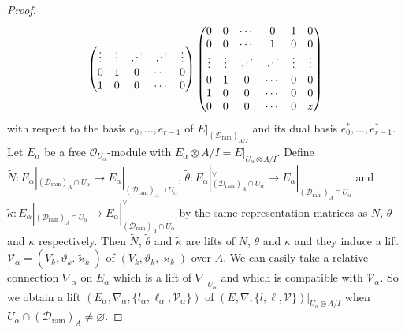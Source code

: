 \documentclass[pdftex]{sigma}
\numberwithin{equation}{section}
\begin{document}
\begin{proof}
\[\begin{pmatrix}
 \vdots & \vdots & \iddots & \iddots & \vdots \\
 0 & 1 & 0 & \cdots & 0 \\
 1 & 0 & 0 & \cdots & 0
 \end{pmatrix}
 \begin{pmatrix}
 0 & 0 & \cdots & 0 & 1 & 0 \\
 0 & 0 & \cdots & 1 & 0 & 0 \\
 \vdots \vspace{2pt}& \vdots & \iddots & \iddots & \vdots & \vdots \\
 0 & 1 & 0 & \cdots & 0 & 0 \\
 1 & 0 & 0 & \cdots & 0 & 0 \\
 0 & 0 & 0 & \cdots & 0 & z
 \end{pmatrix}
\]
with respect to the basis
$e_0,\dots,e_{r-1}$ of $E|_{({\mathcal D}_{\mathrm{ram}})_{A/I}}$
and its dual basis
$e_0^*,\dots,e_{r-1}^*$.
Let $E_{\alpha}$ be a free ${\mathcal O}_{U_{\alpha}}$-module with
$E_{\alpha}\otimes A/I=E|_{U_{\alpha}\otimes A/I}$.
Define
$\tilde{N}\colon E_{\alpha}|_{({\mathcal D}_{\mathrm{ram}})_A\cap U_{\alpha}}
\longrightarrow E_{\alpha}|_{({\mathcal D}_{\mathrm{ram}})_A\cap U_{\alpha}}$,
$\tilde{\theta}\colon E_{\alpha}|_{({\mathcal D}_{\mathrm{ram}})_A\cap U_{\alpha}}^{\vee}
\longrightarrow E_{\alpha}|_{({\mathcal D}_{\mathrm{ram}})_A\cap U_{\alpha}}$
and
$\tilde{\kappa}\colon E_{\alpha}|_{({\mathcal D}_{\mathrm{ram}})_A\cap U_{\alpha}}
\longrightarrow E_{\alpha}|_{({\mathcal D}_{\mathrm{ram}})_A\cap U_{\alpha}}^{\vee}$
by the same representation matrices as $N$, $\theta$ and $\kappa$ respectively.
Then $\tilde{N}$, $\tilde{\theta}$ and $\tilde{\kappa}$ are lifts of $N$, $\theta$ and $\kappa$
and they induce a lift
${\mathcal V}_{\alpha}=(\tilde{V}_k,\tilde{\vartheta}_k.\tilde{\varkappa}_k)$
of $(V_k,\vartheta_k,\varkappa_k)$ over $A$.
We can easily take a relative connection
$\nabla_{\alpha}$ on $E_{\alpha}$ which is a lift of
$\nabla|_{U_{\alpha}}$ and which is compatible with
${\mathcal V}_{\alpha}$.
So we obtain a lift
$(E_{\alpha},\nabla_{\alpha},\{l_{\alpha},\ell_{\alpha},{\mathcal V}_{\alpha}\})$
of $(E,\nabla,\{l,\ell,{\mathcal V}\})|_{U_{\alpha}\otimes A/I}$
when $U_{\alpha}\cap ({\mathcal D}_{\mathrm{ram}})_A\neq\varnothing$.


\end{proof}
\end{document}
